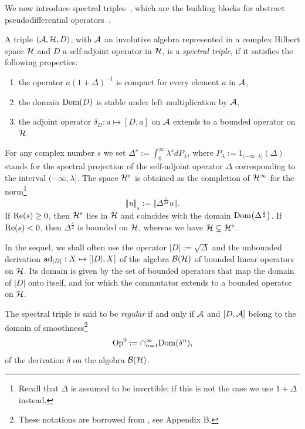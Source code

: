 \documentclass[pdftex]{sigma}
\numberwithin{equation}{section}
\begin{document}
We now introduce spectral triples~\cite{Co}, which  are the building blocks for abstract pseudodif\/ferential operators~\cite{CoMo,Hig}.

\begin{definition} A triple   $({\cal A}, {\cal H}, D)$, with  ${\cal A}$  an
involutive algebra represented in a complex Hilbert space ${\cal H}$ and $D$ a
self-adjoint operator in ${\cal H}$, is a {\it spectral triple}, if it satisf\/ies the
following properties:{\samepage
\begin{enumerate}
\itemsep=-0.5pt
\item[1)] the operator $a  (1+\Delta)^{-1}$ is compact for every element $a$ in
  ${\cal A}$,
\item[2)] the domain ${\rm Dom}(D)$ is stable under left multiplication by
${\cal A}$,
\item[3)] the adjoint operator $\delta_D: a\mapsto [D, a]$ on ${\cal A}$  extends to a bounded operator on ${\cal H}$.
\end{enumerate}}
\end{definition}

 For any complex number $s$
we set $\Delta^s:= \int_0^\infty
 \lambda^s   dP_\lambda$, where $P_\lambda:= 1_{({-}\infty, \lambda]}(\Delta) $
 stands for the spectral projection
of  the self-adjoint operator $\Delta$ corresponding to the interval $({-}\infty,
\lambda]$. The space ${\cal H}^s$ is obtained as the completion of ${\cal H}^\infty$
 for the norm\footnote{Recall that $\Delta$ is assumed to be invertible; if this
 is not the case we use $1+\Delta$ instead.}
 \[
 \Vert u\Vert_s:=\Vert \Delta^{\frac{s}{2d}} u\Vert.
 \]
  If  ${\rm Re}(s)\geq 0$, then  ${\cal H}^s$ lies in $ {\cal H}$ and coincides with
   the domain $ {\rm
  Dom}\big(\Delta^{\frac{s}{2}}\big)$.   If  ${\rm Re}(s)< 0$, then
  $\Delta^{\frac{s}{2}}$ is bounded on ${\cal H}$, whereas we have
  $  {\cal H} \subsetneq {\cal H}^s$.

  In the sequel, we shall often use the operator $\vert D\vert:= \sqrt{\Delta}$
  and  the unbounded derivation ${\rm ad}_{\vert D\vert}:
  X\mapsto [\vert D\vert, X]$ of the algebra  ${\cal B}({\cal H})$ of bounded
  linear operators on ${\cal H}$. Its
     domain is given by the set of bounded operators  that map the domain of
    $\vert D\vert$  onto itself, and for  which the commutator extends
    to a bounded operator on ${\cal H}$.

\begin{definition}
The spectral triple is said to be {\it regular} if and only if ${\cal A}$ and
$[D, {\cal A}]$ belong to the domain of smoothness\footnote{These notations are borrowed from \cite{CoMo},
  see Appendix B.}
  \[
  {\rm Op}^0:=\cap_{n=1}^\infty  {\rm Dom}(\delta^n),
   \]
   of the derivation $\delta$ on the algebra ${\cal B}({\cal H})$.
 \end{definition}
\end{document}
